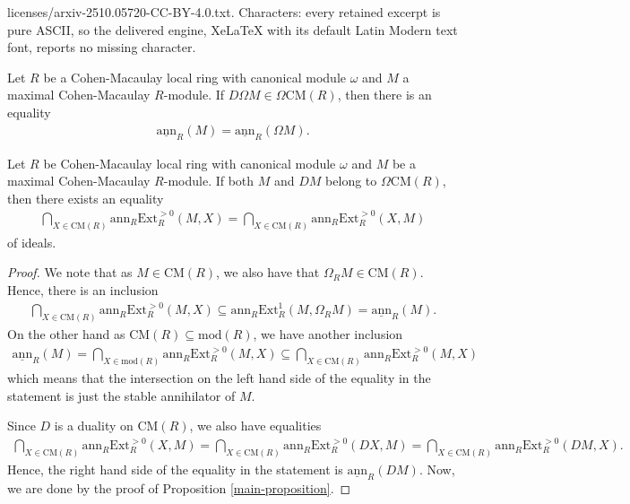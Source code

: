\documentclass[10pt,a4paper]{amsart}
\newcommand{\CM}{\mathrm{CM}}
\newcommand{\Ext}{\mathrm{Ext}}
\newcommand{\ann}{\mathrm{ann}}
\newcommand{\module}{\mathrm{mod}}
\newcommand{\sann}{\underline{\mathrm{ann}}}
\begin{document}
licenses/arxiv-2510.05720-CC-BY-4.0.txt. Characters: every retained excerpt is pure ASCII, so the delivered engine, XeLaTeX with its default Latin Modern text font, reports no missing character.
\begin{proposition}\label{main-proposition}
    Let $R$ be a Cohen-Macaulay local ring with canonical module $\omega$ and $M$ a maximal Cohen-Macaulay $R$-module. If $D\Omega M \in \Omega \CM(R)$, then there is an equality 
    \begin{align*}
    \sann_R(M) = \sann_R(\Omega M).
    \end{align*}
\end{proposition}

\begin{proposition}
    Let $R$ be Cohen-Macaulay local ring with canonical module $\omega$ and $M$ be a maximal Cohen-Macaulay $R$-module. If both $M$ and $DM$ belong to $\Omega \CM(R)$, then there exists an equality
    \begin{align*}
        \bigcap_{X \in \CM(R)} \ann_R \Ext_R^{>0}(M,X) = \bigcap_{X \in \CM(R)} \ann_R \Ext_R^{>0}(X,M)
    \end{align*}
    of ideals.
\end{proposition}

\begin{proof}
    We note that as $M \in \CM(R)$, we also have that $\Omega_RM \in \CM(R)$. Hence, there is an inclusion 
    \begin{align*}
    \bigcap_{X \in \CM(R)} \ann_R \Ext_R^{>0}(M,X) \subseteq \ann_R\Ext_R^1(M, \Omega_R M) = \sann_R(M).
    \end{align*}
    On the other hand as $\CM(R) \subseteq \module(R)$, we have another inclusion 
    \begin{align*}
    \sann_R(M) = \bigcap_{X \in \module(R)} \ann_R \Ext_R^{>0}(M,X) \subseteq \bigcap_{X \in \CM(R)} \ann_R \Ext_R^{>0}(M,X)
    \end{align*}
    which means that the intersection on the left hand side of the equality in the statement is just the stable annihilator of $M$. 
    
    Since $D$ is a duality on $\CM(R)$, we also have equalities
    \begin{align*}
        \bigcap_{X \in \CM(R)} \ann_R \Ext_R^{>0}(X,M) = \bigcap_{X \in \CM(R)} \ann_R \Ext_R^{>0}(DX,M) = \bigcap_{X \in \CM(R)} \ann_R \Ext_R^{>0}(DM,X).
    \end{align*}
    Hence, the right hand side of the equality in the statement is $\sann_R(DM)$. Now, we are done by the proof of Proposition \ref{main-proposition}.
\end{proof}
\end{document}
